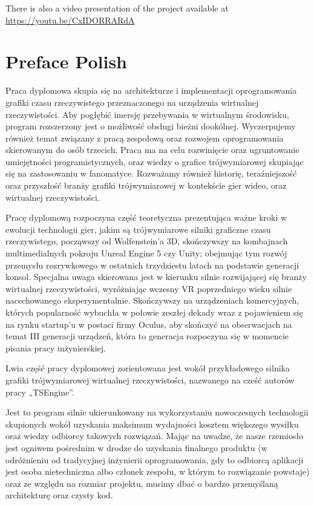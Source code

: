 There is also a video presentation of the project available at \href{https://youtu.be/CxIDORRARdA}{https://youtu.be/CxIDORRARdA}

\newpage
\section{Preface Polish}
Praca dyplomowa skupia się na architekturze i implementacji oprogramowania grafiki czasu rzeczywistego przeznaczonego na urządzenia wirtualnej rzeczywistości. Aby pogłębić imersję przebywania w wirtualnym środowisku, program rozszerzony jest o możliwość obsługi bieżni dookólnej. Wyczerpujemy również temat związany z pracą zespołową oraz rozwojem oprogramowania skierowanym do osób trzecich. Praca ma na celu rozwinięcie oraz ugruntowanie umiejętności programistycznych, oraz wiedzy o grafice trójwymiarowej skupiając się na zastosowaniu w fanomatyce. Rozważamy również historię, teraźniejszość oraz przyszłość branży grafiki trójwymiarowej w kontekście gier wideo, oraz wirtualnej rzeczywistości. 

Pracę dyplomową rozpoczyna część teoretyczna prezentująca ważne kroki w ewolucji technologii gier, jakim są trójwymiarowe silniki graficzne czasu rzeczywistego, począwszy od Wolfenstein’a 3D, skończywszy na kombajnach multimedialnych pokroju Unreal Engine 5 czy Unity; obejmując tym rozwój przemysłu rozrywkowego w ostatnich trzydziestu latach na podstawie generacji konsol. Specjalna uwaga skierowana jest w kierunku silnie rozwijającej się branży wirtualnej rzeczywistości, wyróżniając wczesny VR poprzedniego wieku silnie nacechowanego eksperymentalnie. Skończywszy na urządzeniach komercyjnych, których popularność wybuchła w połowie zeszłej dekady wraz z pojawieniem się na rynku startup’u w postaci firmy Oculus, aby skończyć na obserwacjach na temat III generacji urządzeń, która to generacja rozpoczyna się w momencie pisania pracy inżynierskiej. 
 

Lwia część pracy dyplomowej zorientowana jest wokół przykładowego silnika grafiki trójwymiarowej wirtualnej rzeczywistości, nazwanego na cześć autorów pracy „TSEngine”. 

Jest to program silnie ukierunkowany na wykorzystaniu nowoczesnych technologii skupionych wokół uzyskania maksimum wydajności kosztem większego wysiłku oraz wiedzy odbiorcy takowych rozwiązań. Mając na uwadze, że nasze rzemiosło jest ogniwem pośrednim w drodze do uzyskania finalnego produktu (w odróżnieniu od tradycyjnej inżynierii oprogramowania, gdy to odbiorcą aplikacji jest osoba nietechniczna albo członek zespołu, w którym to rozwiązanie powstaje) oraz ze względu na rozmiar projektu, musimy dbać o bardzo przemyślaną architekturę oraz czysty kod. 
 

